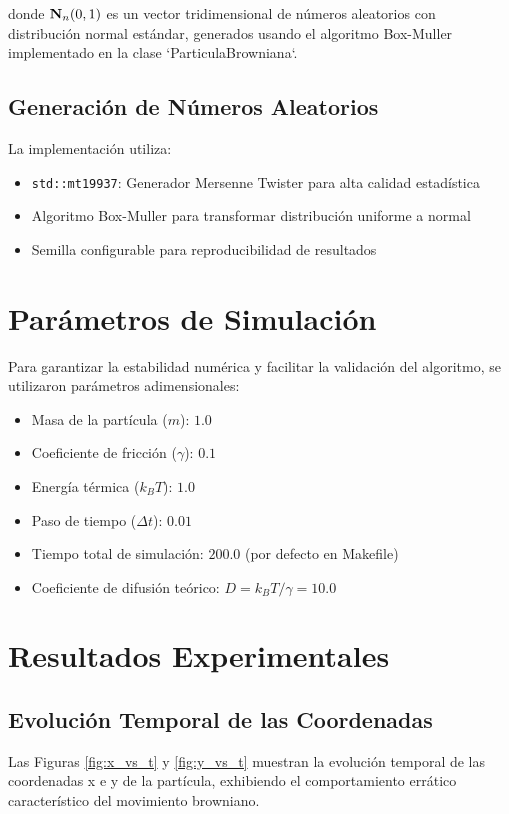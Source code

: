 \documentclass[11pt,a4paper]{article}
\begin{document}
donde $\vb{N}_n(0,1)$ es un vector tridimensional de números aleatorios con distribución normal estándar, generados usando el algoritmo Box-Muller implementado en la clase `ParticulaBrowniana`.

\subsection{Generación de Números Aleatorios}
La implementación utiliza:
\begin{itemize}
    \item \texttt{std::mt19937}: Generador Mersenne Twister para alta calidad estadística
    \item Algoritmo Box-Muller para transformar distribución uniforme a normal
    \item Semilla configurable para reproducibilidad de resultados
\end{itemize}

\section{Parámetros de Simulación}

Para garantizar la estabilidad numérica y facilitar la validación del algoritmo, se utilizaron parámetros adimensionales:

\begin{itemize}
    \item Masa de la partícula ($m$): $1.0$
    \item Coeficiente de fricción ($\gamma$): $0.1$
    \item Energía térmica ($k_B T$): $1.0$
    \item Paso de tiempo ($\Delta t$): $0.01$
    \item Tiempo total de simulación: $200.0$ (por defecto en Makefile)
    \item Coeficiente de difusión teórico: $D = k_B T / \gamma = 10.0$
\end{itemize}

\section{Resultados Experimentales}

\subsection{Evolución Temporal de las Coordenadas}
Las Figuras \ref{fig:x_vs_t} y \ref{fig:y_vs_t} muestran la evolución temporal de las coordenadas x e y de la partícula, exhibiendo el comportamiento errático característico del movimiento browniano.
\end{document}
